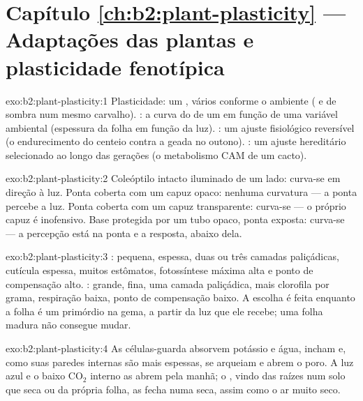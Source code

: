 \section*{Capítulo \ref{ch:b2:plant-plasticity} --- Adaptações das plantas e plasticidade fenotípica}

\begin{solution}{exo:b2:plant-plasticity:1}
Plasticidade: um , vários  conforme o ambiente ( e de sombra num mesmo carvalho). : a curva do
 de um  em função de uma variável ambiental (espessura
da folha em função da luz). : um ajuste fisiológico
reversível (o endurecimento do centeio contra a geada no outono).
: um ajuste hereditário selecionado ao longo das gerações (o
metabolismo CAM de um cacto).
\end{solution}

\begin{solution}{exo:b2:plant-plasticity:2}
Coleóptilo intacto iluminado de um lado: curva-se em direção à luz.
Ponta coberta com um capuz opaco: nenhuma curvatura --- a ponta percebe
a luz. Ponta coberta com um capuz transparente: curva-se --- o próprio
capuz é inofensivo. Base protegida por um tubo opaco, ponta exposta:
curva-se --- a percepção está na ponta e a resposta, abaixo dela.
\end{solution}

\begin{solution}{exo:b2:plant-plasticity:3}
: pequena, espessa, duas ou três camadas paliçádicas,
cutícula espessa, muitos estômatos, fotossíntese máxima alta e ponto de
compensação alto. : grande, fina, uma camada paliçádica,
mais clorofila por grama, respiração baixa, ponto de compensação
baixo. A escolha é feita enquanto a folha é um primórdio na gema, a
partir da luz que ele recebe; uma folha madura não consegue mudar.
\end{solution}

\begin{solution}{exo:b2:plant-plasticity:4}
As células-guarda absorvem potássio e água, incham e, como suas paredes
internas são mais espessas, se arqueiam e abrem o poro. A luz azul e o
baixo $\mathrm{CO_2}$ interno as abrem pela manhã; o ,
vindo das raízes num solo que seca ou da própria folha, as fecha numa
seca, assim como o ar muito seco.
\end{solution}

